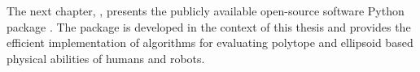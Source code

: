 The next chapter, , presents the publicly available open-source software Python package . The package is developed in the context of this thesis and provides the efficient implementation of algorithms for evaluating polytope and ellipsoid based physical abilities of humans and robots.